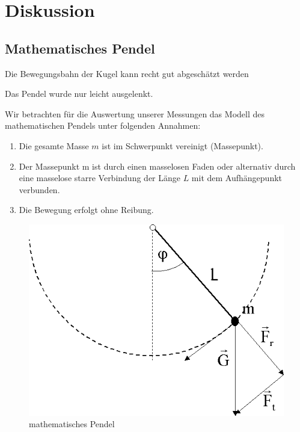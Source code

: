 \documentclass[11pt,a4paper,titlepage, ngerman]{article}
\begin{document}
	\section{Diskussion}	
		\label{Diskussion}		
		
		\subsection{Mathematisches Pendel}
		\label{pendel}
		
		
		Die Bewegungsbahn der Kugel kann recht gut abgeschätzt werden %
		
			Das Pendel wurde nur leicht ausgelenkt. %
			
			Wir betrachten für die Auswertung unserer Messungen das Modell des mathematischen Pendels unter folgenden Annahmen:
			
			\begin{enumerate}
				\item Die gesamte Masse $m$ ist im Schwerpunkt vereinigt (Massepunkt).
				\item Der Massepunkt m ist durch einen masselosen Faden oder alternativ durch eine masselose starre Verbindung der Länge $L$ mit dem Aufhängepunkt verbunden.
				\item Die Bewegung erfolgt ohne Reibung.
			\end{enumerate}
			
			\begin{figure}[ht]
				\centering
				\includegraphics[scale=0.4]{mathematischesPendel.png}		
				\caption{mathematisches Pendel}
				\label{fig:matpendel}
			\end{figure}
			
\end{document}
